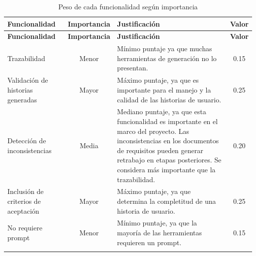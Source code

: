 \begin{longtable}{|p{3cm}|c|p{3cm}|c|}
\hline
\textbf{Funcionalidad} & \textbf{Importancia} & \textbf{Justificación} & \textbf{Valor} \\
\hline
\endfirsthead

\hline
\textbf{Funcionalidad} & \textbf{Importancia} & \textbf{Justificación} & \textbf{Valor} \\
\hline
\endhead

Trazabilidad & Menor &
Mínimo puntaje ya que muchas herramientas de generación no lo presentan. &
0.15 \\
\hline

Validación de historias generadas & Mayor &
Máximo puntaje, ya que es importante para el manejo y la calidad de las historias de usuario. &
0.25 \\
\hline

Detección de inconsistencias & Media &
Mediano puntaje, ya que esta funcionalidad es importante en el marco del proyecto.
Las inconsistencias en los documentos de requisitos pueden generar retrabajo en etapas
posteriores. Se considera más importante que la trazabilidad. &
0.20 \\
\hline

Inclusión de criterios de aceptación & Mayor &
Máximo puntaje, ya que determina la completitud de una historia de usuario. &
0.25 \\
\hline

No requiere prompt & Menor &
Mínimo puntaje, ya que la mayoría de las herramientas requieren un prompt. &
0.15 \\
\hline
\caption{Peso de cada funcionalidad según importancia}
\label{table:ranking-puntos}
\end{longtable}
